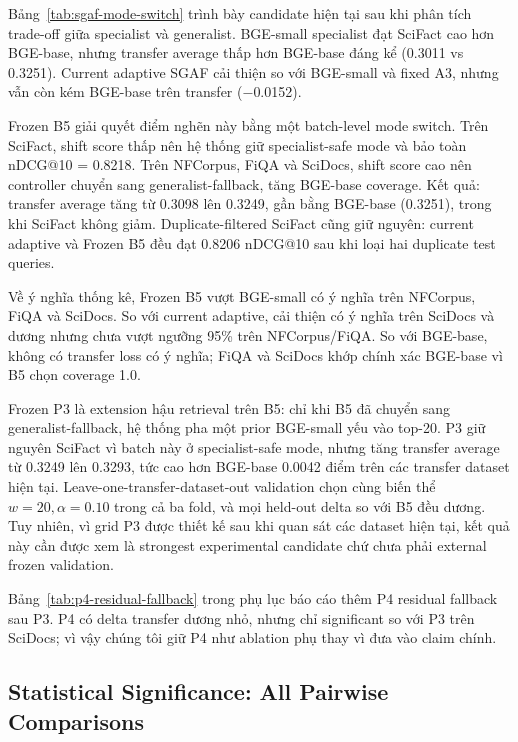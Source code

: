 Bảng~\ref{tab:sgaf-mode-switch} trình bày candidate hiện tại sau khi phân tích trade-off giữa
specialist và generalist. BGE-small specialist đạt SciFact cao hơn BGE-base, nhưng transfer average
thấp hơn BGE-base đáng kể (0.3011 vs 0.3251). Current adaptive SGAF cải thiện so với BGE-small và
fixed A3, nhưng vẫn còn kém BGE-base trên transfer ($-$0.0152).

Frozen B5 giải quyết điểm nghẽn này bằng một batch-level mode switch. Trên SciFact, shift score thấp
nên hệ thống giữ specialist-safe mode và bảo toàn nDCG@10 = 0.8218. Trên NFCorpus, FiQA và SciDocs,
shift score cao nên controller chuyển sang generalist-fallback, tăng BGE-base coverage. Kết quả:
transfer average tăng từ 0.3098 lên 0.3249, gần bằng BGE-base (0.3251), trong khi SciFact không giảm.
Duplicate-filtered SciFact cũng giữ nguyên: current adaptive và Frozen B5 đều đạt 0.8206 nDCG@10 sau
khi loại hai duplicate test queries.

Về ý nghĩa thống kê, Frozen B5 vượt BGE-small có ý nghĩa trên NFCorpus, FiQA và SciDocs. So với current
adaptive, cải thiện có ý nghĩa trên SciDocs và dương nhưng chưa vượt ngưỡng 95\% trên NFCorpus/FiQA.
So với BGE-base, không có transfer loss có ý nghĩa; FiQA và SciDocs khớp chính xác BGE-base vì B5 chọn
coverage 1.0.

Frozen P3 là extension hậu retrieval trên B5: chỉ khi B5 đã chuyển sang generalist-fallback, hệ thống
pha một prior BGE-small yếu vào top-20. P3 giữ nguyên SciFact vì batch này ở specialist-safe mode, nhưng
tăng transfer average từ 0.3249 lên 0.3293, tức cao hơn BGE-base 0.0042 điểm trên các transfer dataset
hiện tại. Leave-one-transfer-dataset-out validation chọn cùng biến thể $w=20,\alpha=0.10$ trong cả ba
fold, và mọi held-out delta so với B5 đều dương. Tuy nhiên, vì grid P3 được thiết kế sau khi quan sát
các dataset hiện tại, kết quả này cần được xem là strongest experimental candidate chứ chưa phải external
frozen validation.

Bảng~\ref{tab:p4-residual-fallback} trong phụ lục báo cáo thêm P4 residual fallback sau P3. P4 có delta transfer
dương nhỏ, nhưng chỉ significant so với P3 trên SciDocs; vì vậy chúng tôi giữ P4 như ablation phụ thay vì
đưa vào claim chính.



\subsection{Statistical Significance: All Pairwise Comparisons}
\label{sec:results:significance}

